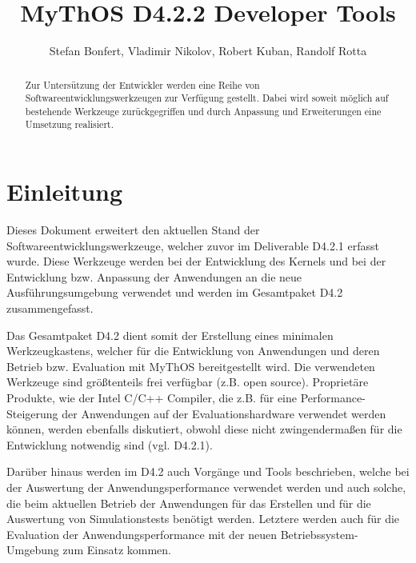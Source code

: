 

\title{MyThOS D4.2.2 Developer Tools}
\author{Stefan Bonfert, Vladimir Nikolov, Robert Kuban, Randolf Rotta}



\maketitle

\begin{abstract}

Zur Untersützung der Entwickler werden eine Reihe von
Softwareentwicklungswerkzeugen zur Verfügung gestellt. Dabei wird soweit möglich
auf bestehende Werkzeuge zurückgegriffen und durch Anpassung und Erweiterungen
eine Umsetzung realisiert.

\end{abstract}

\newpage
\tableofcontents
\newpage

\section{Einleitung}

Dieses Dokument erweitert den aktuellen Stand der Softwareentwicklungswerkzeuge,
welcher zuvor im Deliverable D4.2.1 erfasst wurde.
Diese Werkzeuge werden bei der Entwicklung des Kernels und bei der Entwicklung
bzw. Anpassung der Anwendungen an die neue Ausführungsumgebung verwendet und
werden im Gesamtpaket D4.2 zusammengefasst.

Das Gesamtpaket D4.2 dient somit der Erstellung eines minimalen Werkzeugkastens,
welcher für die Entwicklung von Anwendungen und deren Betrieb bzw. Evaluation
mit MyThOS bereitgestellt wird. Die verwendeten Werkzeuge sind größtenteils frei
verfügbar (z.B. open source). Proprietäre Produkte, wie der Intel C/C++
Compiler, die z.B. für eine Performance-Steigerung der Anwendungen auf der
Evaluationshardware verwendet werden können, werden ebenfalls diskutiert, obwohl
diese nicht zwingendermaßen für die Entwicklung notwendig sind (vgl. D4.2.1).

Darüber hinaus werden im D4.2 auch Vorgänge und Tools beschrieben, welche bei
der Auswertung der Anwendungsperformance verwendet werden und auch solche, die
beim aktuellen Betrieb der Anwendungen für das Erstellen und für die Auswertung
von Simulationstests benötigt werden. Letztere werden auch für die Evaluation
der Anwendungsperformance mit der neuen Betriebssystem-Umgebung zum Einsatz
kommen. 

